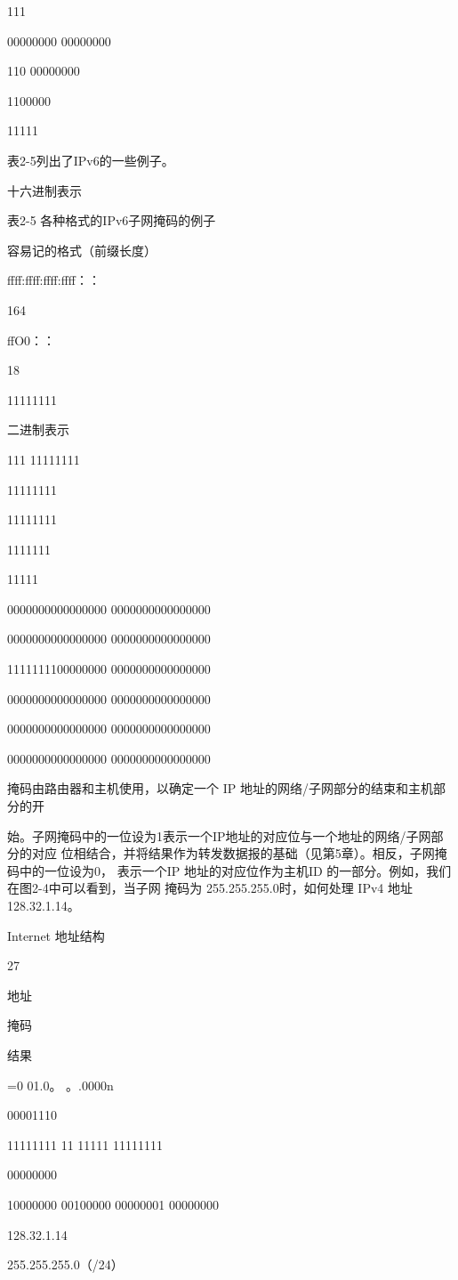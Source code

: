 111

00000000 00000000

110 00000000

1100000

11111

表2-5列出了IPv6的一些例子。

十六进制表示

表2-5 各种格式的IPv6子网掩码的例子

容易记的格式（前缀长度）

ffff:ffff:ffff:ffff：：

164

ffO0：：

18

11111111

二进制表示

111 11111111

11111111

11111111

1111111

11111

0000000000000000 0000000000000000

0000000000000000 0000000000000000

1111111100000000 0000000000000000

0000000000000000 0000000000000000

0000000000000000 0000000000000000

0000000000000000 0000000000000000

掩码由路由器和主机使用，以确定一个 IP 地址的网络/子网部分的结束和主机部分的开

始。子网掩码中的一位设为1表示一个IP地址的对应位与一个地址的网络/子网部分的对应
位相结合，并将结果作为转发数据报的基础（见第5章）。相反，子网掩码中的一位设为0，
表示一个IP 地址的对应位作为主机ID 的一部分。例如，我们在图2-4中可以看到，当子网
掩码为 255.255.255.0时，如何处理 IPv4 地址 128.32.1.14。

Internet 地址结构

27

地址

掩码

结果

=0 01.0。 。.0000n

00001110

11111111 11 11111 11111111

00000000

10000000 00100000 00000001 00000000

128.32.1.14

255.255.255.0（/24）

